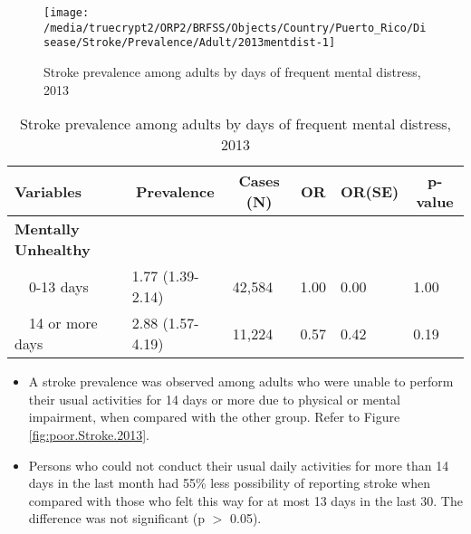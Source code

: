 \begin{figure}[H]
\centering
\caption{Stroke prevalence among adults by days of frequent mental distress, 2013}
\label{fig:mental.Stroke.2013}

\begin{knitrout}
\color{fgcolor}

{\centering \texttt{[image: /media/truecrypt2/ORP2/BRFSS/Objects/Country/Puerto\_Rico/Disease/Stroke/Prevalence/Adult/2013mentdist-1]} 

}



\end{knitrout}
 \end{figure}

\begin{table}[H]
\caption{Stroke prevalence among adults by days of frequent mental distress, 2013\label{tab:mental.Stroke.2013}} 
\begin{center}
\begin{tabular}{llllll}
\hline\hline
\multicolumn{1}{l}{Variables}&\multicolumn{1}{c}{Prevalence}&\multicolumn{1}{c}{Cases (N)}&\multicolumn{1}{c}{OR}&\multicolumn{1}{c}{OR(SE)}&\multicolumn{1}{c}{p-value}\tabularnewline
\hline
{\bfseries Mentally Unhealthy}&&&&&\tabularnewline
~~0-13 days&1.77 (1.39-2.14)&42,584&1.00&0.00&1.00\tabularnewline
~~14 or more days&2.88 (1.57-4.19)&11,224&0.57&0.42&0.19\tabularnewline
\hline
\end{tabular}\end{center}

\end{table}



 \newpage
\begin{itemize}

\item A  
stroke prevalence was observed among adults who were unable to perform their usual activities for 14 days or more due to physical or mental impairment, when compared with the other group. Refer to Figure \ref{fig:poor.Stroke.2013}.



\item Persons who could not conduct their usual daily activities for more than 14 days in the last month had 55\% less possibility of reporting stroke when compared with those who felt this way for at most 13 days in the last 30. The difference was not significant (p $>$ 0.05).

\end{itemize}

